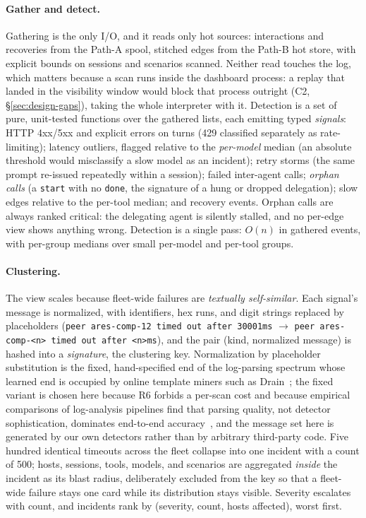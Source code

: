 \paragraph{Gather and detect.} Gathering is the only I/O, and it reads only
hot sources: interactions and recoveries from the Path-A spool, stitched
edges from the Path-B hot store, with explicit bounds on sessions and
scenarios scanned. Neither read touches the log, which matters because a
scan runs inside the dashboard process: a replay that landed in the
visibility window would block that process outright (C2,
\S\ref{sec:design-gaps}), taking the whole interpreter with it.
Detection is a set of pure, unit-tested functions over the gathered lists,
each emitting typed \emph{signals}: HTTP 4xx/5xx and explicit errors on
turns (429 classified separately as rate-limiting); latency outliers,
flagged relative to the \emph{per-model} median (an absolute threshold
would misclassify a slow model as an incident); retry storms (the same
prompt re-issued repeatedly within a session); failed inter-agent calls;
\emph{orphan calls} (a \texttt{start} with no \texttt{done}, the
signature of a hung or dropped delegation); slow edges relative to the
per-tool median; and recovery events. Orphan calls are always ranked
critical: the delegating agent is silently stalled, and no per-edge view
shows anything wrong.
Detection is a single pass: $O(n)$ in gathered events, with per-group
medians over small per-model and per-tool groups.

\paragraph{Clustering.} The view scales because fleet-wide failures are
\emph{textually self-similar}. Each signal's
message is normalized, with identifiers, hex runs, and digit strings replaced
by placeholders (\texttt{peer ares-comp-12 timed out after 30001ms}
$\to$ \texttt{peer ares-comp-<n> timed out after <n>ms}), and the pair
(kind, normalized message) is hashed into a \emph{signature}, the
clustering key. Normalization by placeholder substitution is the fixed,
hand-specified end of the log-parsing spectrum whose learned end is
occupied by online template miners such as
Drain~\cite{he2017drain}; the fixed variant is chosen here because
R6 forbids a per-scan cost and because empirical comparisons of log-analysis
pipelines find that parsing quality, not detector sophistication, dominates
end-to-end accuracy~\cite{he2016loganalysis}, and the message set here is
generated by our own detectors rather than by arbitrary third-party code.
Five hundred identical timeouts across the fleet collapse
into one incident with a count of 500; hosts, sessions, tools, models, and
scenarios are aggregated \emph{inside} the incident as its blast radius,
deliberately excluded from the key so that a fleet-wide failure stays one
card while its distribution stays visible. Severity escalates with count,
and incidents rank by (severity, count, hosts affected), worst first.

